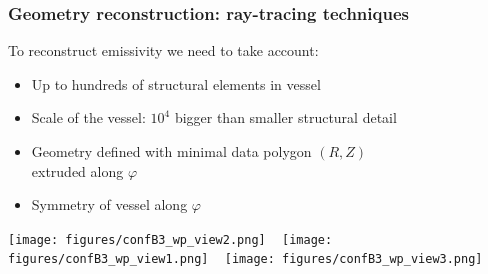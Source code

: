 \documentclass[10pt]{beamer}
\begin{document}
\begin{frame}
\frametitle{Geometry reconstruction: ray-tracing techniques}

	To reconstruct emissivity we need to take account:
	\begin{itemize}
	\item Up to hundreds of structural elements in vessel
	\item Scale of the vessel:
	$10^4$ bigger than smaller structural detail

	\item Geometry defined with minimal data polygon $(R,Z)$\\ extruded along $\varphi$
	\item Symmetry of vessel along $\varphi$
	
	\end{itemize}
	
	\vspace{0.5cm}
	\begin{center}
		\texttt{[image: figures/confB3\_wp\_view2.png]}%
		~
		\texttt{[image: figures/confB3\_wp\_view1.png]}%
		~
		\texttt{[image: figures/confB3\_wp\_view3.png]}%
	\end{center}
	
\end{frame}
\end{document}
